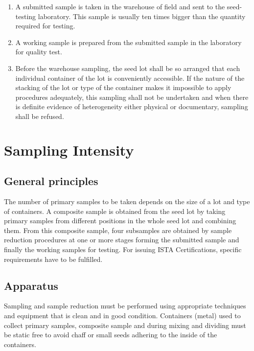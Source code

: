 \documentclass[
]{book}
\providecommand{\tightlist}{%
  \setlength{\itemsep}{0pt}\setlength{\parskip}{0pt}}
\begin{document}
\begin{enumerate}
\def\labelenumi{\arabic{enumi}.}
\tightlist
\item
  A submitted sample is taken in the warehouse of field and sent to the seed-testing laboratory. This sample is usually ten times bigger than the quantity required for testing.
\item
  A working sample is prepared from the submitted sample in the laboratory for quality test.
\item
  Before the warehouse sampling, the seed lot shall be so arranged that each individual container of the lot is conveniently accessible. If the nature of the stacking of the lot or type of the container makes it impossible to apply procedures adequately, this sampling shall not be undertaken and when there is definite evidence of heterogeneity either physical or documentary, sampling shall be refused.
\end{enumerate}

\hypertarget{sampling-intensity}{%
\section{Sampling Intensity}\label{sampling-intensity}}

\hypertarget{general-principles}{%
\subsection{General principles}\label{general-principles}}

The number of primary samples to be taken depends on the size of a lot and type of containers. A composite sample is obtained from the seed lot by taking primary samples from different positions in the whole seed lot and combining them. From this composite sample, four subsamples are obtained by sample reduction procedures at one or more stages forming the submitted sample and finally the working samples for testing. For issuing ISTA Certifications, specific requirements have to be fulfilled.

\hypertarget{apparatus}{%
\subsection{Apparatus}\label{apparatus}}

Sampling and sample reduction must be performed using appropriate techniques and equipment that is clean and in good condition. Containers (metal) used to collect primary samples, composite sample and during mixing and dividing must be static free to avoid chaff or small seeds adhering to the inside of the containers.
\end{document}
